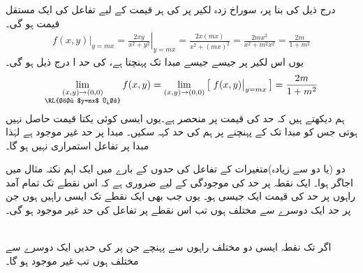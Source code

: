 درج ذیل کی بنا پر، سوراخ زدہ لکیر  پر  کی ہر قیمت کے لیے تفاعل  کی ایک مستقل قیمت  ہو گی۔
\begin{align*}
\left. f(x,y)\right\vert_{y=mx}=\left. \frac{2xy}{x^2+y^2}\right\vert_{y=mx}=\frac{2x(mx)}{x^2+(mx)^2}=\frac{2mx^2}{x^2+m^2x^2}=\frac{2m}{1+m^2}
\end{align*}
یوں  اس لکیر  پر جیسے جیسے    مبدا تک پہنچتا ہے،   کی حد ا درج ذیل ہو گی۔
\begin{align*}
\lim_{\substack{(x,y)\to(0,0)\\ \text{\RL{خط $y=mx$ پر}}}} f(x,y)=\lim_{(x,y)\to(0,0)}\big[\left.f(x,y)\right\vert_{y=mx}\big]=\frac{2m}{1+m^2}
\end{align*}
ہم دیکھتے ہیں کہ حد کی قیمت  پر منحصر ہے۔یوں ایسی کوئی   یکتا قیمت حاصل نہیں ہوتی  جس کو    مبدا تک  کے  پہنچنے   پر ہم    کی حد کہہ سکیں۔ مبدا پر حد غیر موجود ہے لہٰذا مبدا  پر تفاعل  استمراری  نہیں ہو گا۔

دو  (یا دو سے زیادہ)متغیرات کے تفاعل کی  حدوں کے بارے میں ایک اہم نکتہ  مثال  میں  اجاگر ہوا۔ ایک نقطہ پر حد کی موجودگی کے لیے  ضروری ہے کہ اس نقطے تک  تمام آمد    راہوں  پر  حد  کی قیمت ایک جیسی  ہو۔  یوں جب بھی  ایک نقطے تک  ایسی راہیں  ہوں جن  پر حد ایک دوسرے سے  مختلف ہوں  تب  اس نقطے  پر تفاعل کی حد غیر موجود ہو گی۔

\\
اگر  تک نقطہ  ایسی دو مختلف راہوں سے پہنچے جن پر  کی حدیں ایک دوسرے سے مختلف ہوں تب  غیر موجود ہو گا۔

